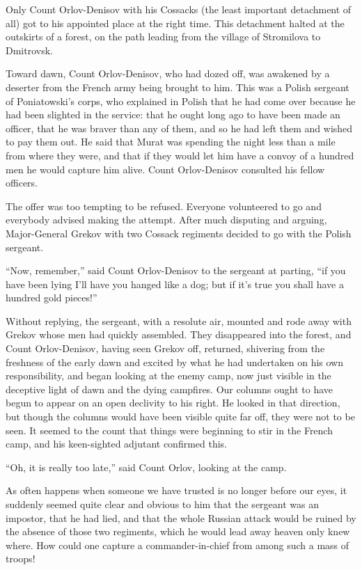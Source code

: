 Only Count Orlov-Denisov with his Cossacks (the least important
detachment of all) got to his appointed place at the right
time. This detachment halted at the outskirts of a forest, on the
path leading from the village of Stromilova to Dmitrovsk.

Toward dawn, Count Orlov-Denisov, who had dozed off, was awakened
by a deserter from the French army being brought to him. This was
a Polish sergeant of Poniatowski's corps, who explained in Polish
that he had come over because he had been slighted in the
service: that he ought long ago to have been made an officer,
that he was braver than any of them, and so he had left them and
wished to pay them out. He said that Murat was spending the night
less than a mile from where they were, and that if they would let
him have a convoy of a hundred men he would capture him
alive. Count Orlov-Denisov consulted his fellow officers.

The offer was too tempting to be refused. Everyone volunteered to
go and everybody advised making the attempt. After much disputing
and arguing, Major-General Grekov with two Cossack regiments
decided to go with the Polish sergeant.

``Now, remember,'' said Count Orlov-Denisov to the sergeant at
parting, ``if you have been lying I'll have you hanged like a
dog; but if it's true you shall have a hundred gold pieces!''

Without replying, the sergeant, with a resolute air, mounted and
rode away with Grekov whose men had quickly assembled. They
disappeared into the forest, and Count Orlov-Denisov, having seen
Grekov off, returned, shivering from the freshness of the early
dawn and excited by what he had undertaken on his own
responsibility, and began looking at the enemy camp, now just
visible in the deceptive light of dawn and the dying
campfires. Our columns ought to have begun to appear on an open
declivity to his right. He looked in that direction, but though
the columns would have been visible quite far off, they were not
to be seen.  It seemed to the count that things were beginning to
stir in the French camp, and his keen-sighted adjutant confirmed
this.

``Oh, it is really too late,'' said Count Orlov, looking at the
camp.

As often happens when someone we have trusted is no longer before
our eyes, it suddenly seemed quite clear and obvious to him that
the sergeant was an impostor, that he had lied, and that the
whole Russian attack would be ruined by the absence of those two
regiments, which he would lead away heaven only knew where. How
could one capture a commander-in-chief from among such a mass of
troops!

